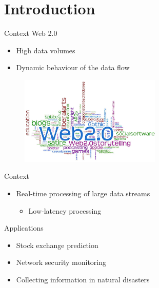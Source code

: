 \section[1]{Introduction}

\begin{frame}{Context}
	Web 2.0
		\begin{itemize}
			\item High data volumes
			\item Dynamic behaviour of the data flow
		\end{itemize}
	
	\begin{figure}
    	\includegraphics[width=0.6\textwidth]{images/problems/Web.jpg}
    \end{figure}
\end{frame}

\begin{frame}{Context}
		\begin{itemize}
			\item Real-time processing of large data streams
			\begin{itemize}
				\item Low-latency processing
			\end{itemize}
		\end{itemize}
	
		Applications
		\begin{itemize}
			\item Stock exchange prediction
			\item Network security monitoring
			\item Collecting information in natural disasters
		\end{itemize}
\end{frame}

